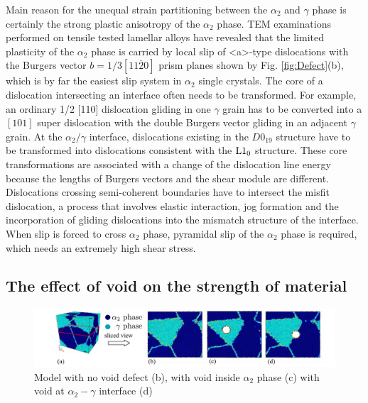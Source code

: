 \documentclass[Unknown,article,submit,moreauthors,pdftex,10pt,a4paper]{Definitions/mdpi}
\begin{document}
Main reason for the unequal strain partitioning between the $\alpha_2$ and $\gamma$ phase is certainly the strong plastic anisotropy of the $\alpha_2$ phase. TEM examinations performed on tensile tested lamellar alloys have revealed that the limited plasticity of the $\alpha_2$ phase is carried by local slip of <a>-type dislocations with the Burgers vector $b=1/3[11\overline{2}0]$ prism planes shown by Fig. \ref{fig:Defect}(b), which is by far the easiest slip system in $\alpha_2$ single crystals.  The core of a dislocation intersecting an interface often needs to be transformed. For example, an ordinary 1/2 [110] dislocation gliding in one $\gamma$ grain has to be converted into a $[101]$ super dislocation with the double Burgers vector gliding in an adjacent $\gamma$ grain. At the $\alpha_2/\gamma$ interface, dislocations existing in the $D0_{19}$ structure have to be transformed into dislocations consistent with the $\rm{L1_0}$ structure. These core transformations are associated with a change of the dislocation line energy because the lengths of Burgers vectors and the shear module are different. Dislocations crossing semi-coherent boundaries have to intersect the misfit dislocation, a process that involves elastic interaction, jog formation and the incorporation of gliding dislocations into the mismatch structure of the interface. When slip is forced to cross $\alpha_2$ phase, pyramidal slip of the $\alpha_2$ phase is required, which needs an extremely high shear stress.


\subsection{The effect of void on the strength of material}

\begin{figure}[ht]
	\centering
	\includegraphics[width=1\linewidth]{img/slice-view}
	\caption{ Model with no void defect (b), with void inside $\alpha_2$ phase (c) with void at $\alpha_2-\gamma$ interface (d)}
	\label{fig:model-creation}
\end{figure}
\end{document}

